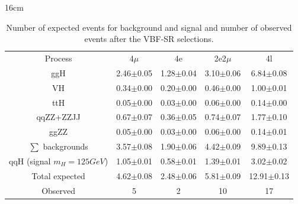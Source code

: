 \begin{table}[hbtp]{16cm}
	\footnotesize
	\caption{Number of expected events for background and signal and number of observed events after the VBF-SR selections.}
	\centering
	\begin{tabular}{c|c|c|c|c}
		\hline
		\rowcolor{light_gray}
		Process                     & 4$\mu$        & 4e            & 2e2$\mu$      & 4l\\
		ggH                         & 2.46$\pm$0.05 & 1.28$\pm$0.04 & 3.10$\pm$0.06 & 6.84$\pm$0.08\\
		VH                          & 0.34$\pm$0.00 & 0.20$\pm$0.00 & 0.46$\pm$0.00 & 1.00$\pm$0.01\\
		ttH                         & 0.05$\pm$0.00 & 0.03$\pm$0.00 & 0.06$\pm$0.00 & 0.14$\pm$0.00\\
		qqZZ+ZZJJ                   & 0.67$\pm$0.07 & 0.36$\pm$0.05 & 0.74$\pm$0.07 & 1.77$\pm$0.10\\
		ggZZ                        & 0.05$\pm$0.00 & 0.03$\pm$0.00 & 0.06$\pm$0.00 & 0.14$\pm$0.01\\
		\hline
		$\sum$ backgrounds          & 3.57$\pm$0.08 & 1.90$\pm$0.06 & 4.42$\pm$0.09 &  9.89$\pm$0.13\\
		\hline
		qqH (signal $m_{H}=125GeV$) & 1.05$\pm$0.01 & 0.58$\pm$0.01 & 1.39$\pm$0.01 &  3.02$\pm$0.02\\
		\hline
		Total expected              & 4.62$\pm$0.08 & 2.48$\pm$0.06 & 5.81$\pm$0.09 & 12.91$\pm$0.13\\
		\hline
		Observed                    & 5             & 2             & 10            & 17\\
		\hline
	\end{tabular}
	\label{tab:vbf_sr_yields}
\end{table}

